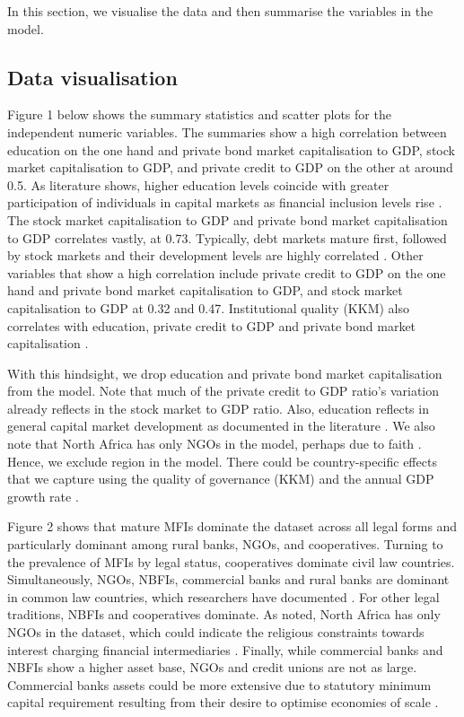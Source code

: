 \documentclass[a4paper,nobind]{templates/ociamthesis}
\begin{document}
In this section, we visualise the data and then summarise the variables in the model.

\hypertarget{data-visualisation}{%
\subsection{Data visualisation}\label{data-visualisation}}

Figure 1 below shows the summary statistics and scatter plots for the independent numeric variables. The summaries show a high correlation between education on the one hand and private bond market capitalisation to GDP, stock market capitalisation to GDP, and private credit to GDP on the other at around 0.5. As literature shows, higher education levels coincide with greater participation of individuals in capital markets as financial inclusion levels rise \autocite{allen2013resolving,allen2014african,ito2018quantity}. The stock market capitalisation to GDP and private bond market capitalisation to GDP correlates vastly, at 0.73. Typically, debt markets mature first, followed by stock markets and their development levels are highly correlated \autocite{levine1999stock}. Other variables that show a high correlation include private credit to GDP on the one hand and private bond market capitalisation to GDP, and stock market capitalisation to GDP at 0.32 and 0.47. Institutional quality (KKM) also correlates with education, private credit to GDP and private bond market capitalisation \autocite{yartey2008determinants}.

With this hindsight, we drop education and private bond market capitalisation from the model. Note that much of the private credit to GDP ratio's variation already reflects in the stock market to GDP ratio. Also, education reflects in general capital market development as documented in the literature \autocite{allen2013resolving,allen2014african}. We also note that North Africa has only NGOs in the model, perhaps due to faith \autocite{allen2013resolving,allen2014african,hassan2018religious}. Hence, we exclude region in the model. There could be country-specific effects that we capture using the quality of governance (KKM) \autocite{kunvcivc2014institutional} and the annual GDP growth rate \autocite{butkiewicz2006institutional}.

Figure 2 shows that mature MFIs dominate the dataset across all legal forms and particularly dominant among rural banks, NGOs, and cooperatives. Turning to the prevalence of MFIs by legal status, cooperatives dominate civil law countries. Simultaneously, NGOs, NBFIs, commercial banks and rural banks are dominant in common law countries, which researchers have documented \autocite{pashkova2016business}. For other legal traditions, NBFIs and cooperatives dominate. As noted, North Africa has only NGOs in the dataset, which could indicate the religious constraints towards interest charging financial intermediaries \autocite{hassan2018religious}. Finally, while commercial banks and NBFIs show a higher asset base, NGOs and credit unions are not as large. Commercial banks assets could be more extensive due to statutory minimum capital requirement resulting from their desire to optimise economies of scale \autocite{aiyar2016does}.
\end{document}

